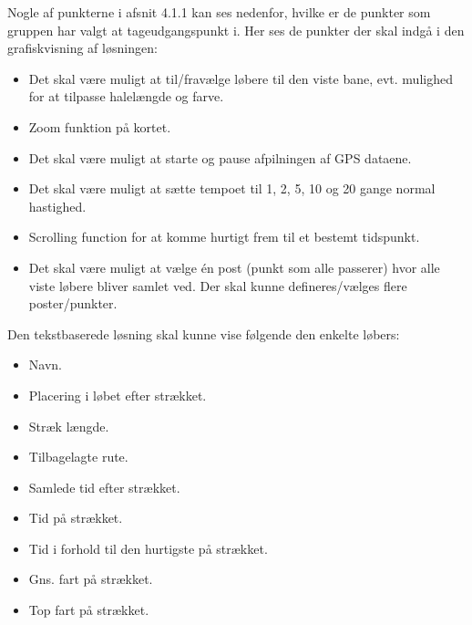 Nogle af punkterne i afsnit 4.1.1 kan ses nedenfor, hvilke er de punkter som gruppen har valgt at tageudgangspunkt i. Her ses de punkter der skal indgå i den grafiskvisning af løsningen:
\begin{itemize}
\item Det skal være muligt at til/fravælge løbere til den viste bane, evt. mulighed for at tilpasse halelængde og farve.
\item Zoom funktion på kortet.
\item Det skal være muligt at starte og pause afpilningen af GPS dataene.
\item Det skal være muligt at sætte tempoet til 1, 2, 5, 10 og 20 gange normal hastighed.
\item Scrolling function for at komme hurtigt frem til et bestemt tidspunkt.
\item Det skal være muligt at vælge én post (punkt som alle passerer) hvor alle viste løbere bliver samlet ved. Der skal kunne defineres/vælges flere poster/punkter.
\end{itemize}
Den tekstbaserede løsning skal kunne vise følgende den enkelte løbers:
\begin{itemize}
\item Navn.
\item Placering i løbet efter strækket.
\item Stræk længde.
\item Tilbagelagte rute.
\item Samlede tid efter strækket.
\item Tid på strækket.
\item Tid i forhold til den hurtigste på strækket.
\item Gns. fart på strækket.
\item Top fart på strækket.
\end{itemize}
